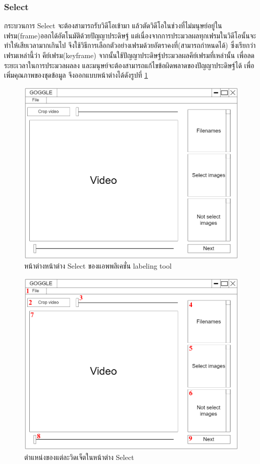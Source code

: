 \subsubsection{Select}
กระบวนการ Select จะต้องสามารถรับวิดีโอเข้ามา แล้วตัดวิดีโอในช่วงที่ไม่มนุษย์อยู่ในเฟรม(frame)ออกได้อัตโนมัติด้วยปัญญาประดิษฐ์
แต่เนื่องจากการประมวลผลทุกเฟรมในวิดีโอนั้นจะทำให้เสียเวลามากเกินไป จึงใช้วิธีการเลือกตัวอย่างเฟรมด้วยอัตราคงที่(สามารถกำหนดได้)
ซึ่งเรียกว่าเฟรมเหล่านี้ว่า คีย์เฟรม(keyframe) จากนั้นใช้ปัญญาประดิษฐ์ประมวลผลคีย์เฟรมที่เหล่านั้น 
เพื่อลดระยะเวลาในการประมวลผลลง และมนุษย์จะต้องสามารถแก้ไขข้อผิดพลาดของปัญญาประดิษฐ์ได้ 
เพื่อเพิ่มคุณภาพของชุดข้อมูล จึงออกแบบหน้าต่างได้ดังรูปที่ \ref{fig:SelectDraft}

\begin{figure}[!ht]
    \centering
    \includegraphics[width=1\textwidth]{chapter3/images/3_6/SelectDraft.png}
    \caption{หน้าต่างหน้าต่าง Select ของแอพพลิเคชั่น labeling tool}
    \label{fig:SelectDraft}
\end{figure}
\clearpage
\begin{figure}[!ht]
    \centering
    \includegraphics[width=1\textwidth]{chapter3/images/3_6/SelectDraft_point.png}
    \caption{ตำแหน่งของแต่ละวิดเจ็ตในหน้าต่าง Select}
    \label{fig:SelectDraft_point}
\end{figure}
